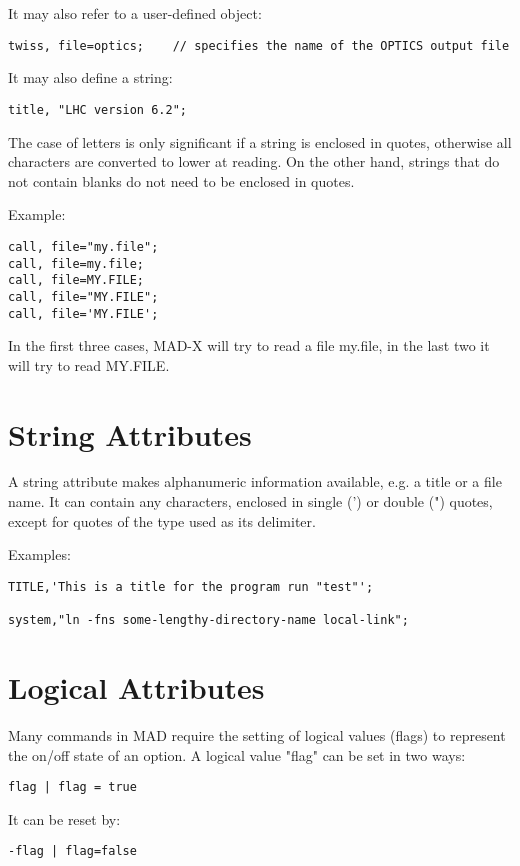 It may also refer to a user-defined object: 
\begin{verbatim}
twiss, file=optics;    // specifies the name of the OPTICS output file
\end{verbatim} 

It may also define a string: 
\begin{verbatim}
title, "LHC version 6.2";
\end{verbatim} 

The case of letters is only significant if a string is enclosed in
quotes, otherwise all characters are converted to lower at reading. On
the other hand, strings that do not contain blanks do not need to be
enclosed in quotes. 

Example:
\begin{verbatim}
call, file="my.file";
call, file=my.file;
call, file=MY.FILE;
call, file="MY.FILE";
call, file='MY.FILE';
\end{verbatim} 
In the first three cases, MAD-X will try to read a file my.file, in the
last two it will try to read MY.FILE.  


%
\section{String Attributes}
\label{sec:string}
A string attribute makes alphanumeric information available, e.g. a
title or a file name. It can contain any characters, enclosed in single
(') or double (") quotes, except for quotes of the type used as its
delimiter.  

Examples: 
\begin{verbatim}
TITLE,'This is a title for the program run "test"';

system,"ln -fns some-lengthy-directory-name local-link";
\end{verbatim}


%
\section{Logical Attributes}
\label{sec:logical}
Many commands in MAD require the setting of logical values (flags) to
represent the on/off state of an option. A logical value "flag" can be
set in two ways:  
\begin{verbatim}
flag | flag = true
\end{verbatim} 

It can be reset by: 
\begin{verbatim}
-flag | flag=false
\end{verbatim} 


